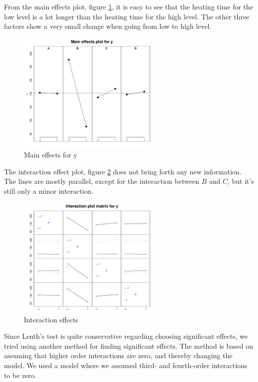 From the main effects plot, figure \ref{fig:mainEff}, it is easy to see that the heating time for the low level is a lot longer than the heating time for the high level. The other three factors show a very small change when going from low to high level.

\begin{figure}[H]
    \centering
    \includegraphics[width=0.6\textwidth]{PDF/mainEffects4factors.pdf}
    \caption{Main effects for y}
    \label{fig:mainEff}
\end{figure}

The interaction effect plot, figure \ref{fig:interaction} does not bring forth any new information. The lines are mostly parallel, except  for the interaction between $B$ and $C$, but it's still only a minor interaction.

\begin{figure}[H]
    \centering
    \includegraphics[width=0.6\textwidth]{PDF/interactionPlot4factors.pdf}
    \caption{Interaction effects}
    \label{fig:interaction}
\end{figure}

Since Lenth's test is quite conservative regarding choosing significant effects, we tried using another method for finding significant effects. The method is based on assuming that higher order interactions are zero, and thereby changing the model. We used a model where we assumed third- and fourth-order interactions to be zero.

